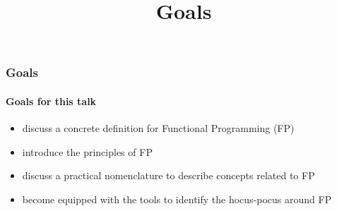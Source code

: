 {


  \begin{frame}[plain] 
  \title{Goals}
  
  \vspace{3em}

  \begin{TitleBoxGoals}
    \begin{center}
    {\Large \inserttitle}
    \end{center}
  \end{TitleBoxGoals}

  \end{frame}
}


\begin{frame}
\frametitle{Goals}
\framesubtitle{Goals for this talk}
\begin{center}

\begin{itemize}
  \item<1-> discuss a concrete definition for Functional Programming (FP)
  \item<2-> introduce the principles of FP
  \item<3-> discuss a practical nomenclature to describe concepts related to FP
  \item<4-> become equipped with the tools to identify the hocus-pocus around FP
\end{itemize}


\end{center}
\end{frame}
